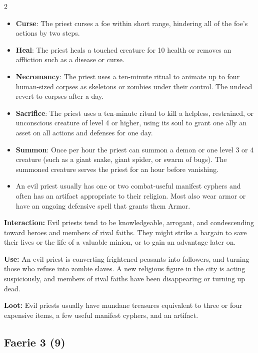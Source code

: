 \begin{multicols}{2}
\begin{itemize}
\item \textbf{Curse}: The priest curses a foe within short range, hindering all of the foe’s actions by two steps. 
\item \textbf{Heal}: The priest heals a touched creature for 10 health or removes an affliction such as a disease or curse. 
\item \textbf{Necromancy}: The priest uses a ten-minute ritual to animate up to four human-sized corpses as skeletons or zombies under their control. The undead revert to corpses after a day. 
\item \textbf{Sacrifice}: The priest uses a ten-minute ritual to kill a helpless, restrained, or unconscious creature of level 4 or higher, using its soul to grant one ally an asset on all actions and defenses for one day. 
\item \textbf{Summon}: Once per hour the priest can summon a demon or one level 3 or 4 creature (such as a giant snake, giant spider, or swarm of bugs). The summoned creature serves the priest for an hour before vanishing. 
\item An evil priest usually has one or two combat-useful manifest cyphers and often has an artifact appropriate to their religion. Most also wear armor or have an ongoing defensive spell that grants them Armor. 
\end{itemize}

\textbf{Interaction:} Evil priests tend to be knowledgeable, arrogant, and condescending toward heroes and members of rival faiths. They might strike a bargain to save their lives or the life of a valuable minion, or to gain an advantage later on. 

\textbf{Use:} An evil priest is converting frightened peasants into followers, and turning those who refuse into zombie slaves. A new religious figure in the city is acting suspiciously, and members of rival faiths have been disappearing or turning up dead. 

\textbf{Loot:} Evil priests usually have mundane treasures equivalent to three or four expensive items, a few useful manifest cyphers, and an artifact.

\subsection{Faerie 3 (9)}


\end{multicols}
